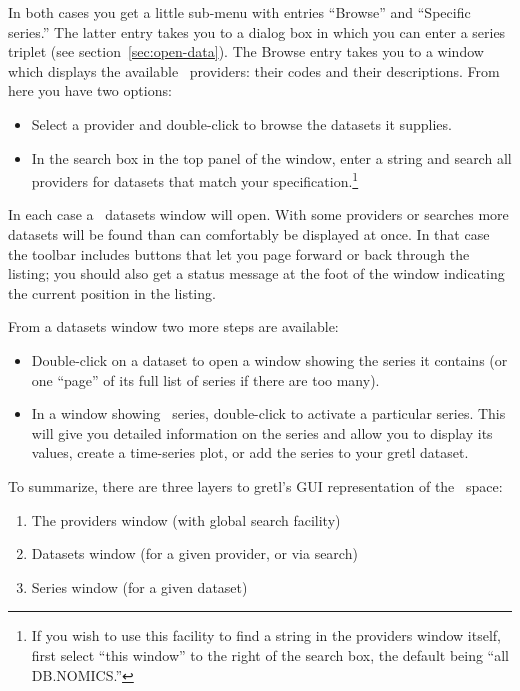 \documentclass{article}
\begin{document}
In both cases you get a little sub-menu with entries
``\textsf{Browse}'' and ``\textsf{Specific series}.'' The latter entry
takes you to a dialog box in which you can enter a series triplet (see
section~\ref{sec:open-data}). The \textsf{Browse} entry takes you to a
window which displays the available \DB\ providers: their
codes and their descriptions. From here you have two options:
\begin{itemize}
\item Select a provider and double-click to browse the datasets it
  supplies.
\item In the search box in the top panel of the window, enter a string
  and search all providers for datasets that match your
  specification.\footnote{If you wish to use this facility to find a
    string in the providers window itself, first select ``\textsf{this
      window}'' to the right of the search box, the default being
    ``\textsf{all DB.NOMICS}.''}
\end{itemize}

In each case a \DB\ datasets window will open. With some
providers or searches more datasets will be found than can comfortably
be displayed at once. In that case the toolbar includes buttons that
let you page forward or back through the listing; you should also get
a status message at the foot of the window indicating the current
position in the listing.

From a datasets window two more steps are available:
\begin{itemize}
\item Double-click on a dataset to open a window showing the series it
  contains (or one ``page'' of its full list of series if there are
  too many).
\item In a window showing \DB\ series, double-click to
  activate a particular series. This will give you detailed
  information on the series and allow you to display its values,
  create a time-series plot, or add the series to your gretl dataset.
\end{itemize}

To summarize, there are three layers to gretl's GUI representation of
the \DB\ space:
\begin{enumerate}
\item The providers window (with global search facility)
\item Datasets window (for a given provider, or via search)
\item Series window (for a given dataset)
\end{enumerate}
\end{document}
